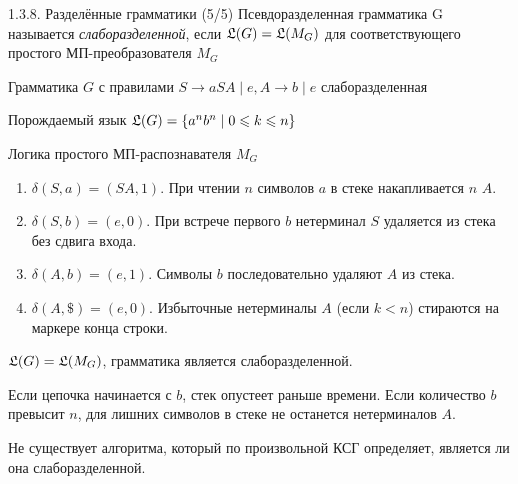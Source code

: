 \documentclass[mathserif,12pt,aspectratio=169]{beamer}
\renewcommand{\index}[1]{}
\def\odmkey#1#2{{\it\color{red} #1}\index{#2}}
\let\leq\leqslant
\begin{document}
\begin{frame}{1.3.8. Разделённые грамматики (5/5)}
Псевдоразделенная грамматика G называется \odmkey{слаборазделенной}{Слаборазделенная! грамматика}, если $\frak{L}(G) = \frak{L}(M_G)$ для соответствующего простого МП-преобразователя $M_G$

\begin{example}
    Грамматика $G$ с правилами \(S \to a S A \mid e, A \to b \mid e\) слаборазделенная

    Порождаемый язык \(\frak{L} (G) = \{ a^n b^n \mid  0 \leq k \leq n \} \)

    Логика простого МП-распознавателя \( M_G \)

\begin{enumerate}
\item \( \delta(S, a) = (SA, 1) \). При чтении \( n \) символов \( a \) в стеке накапливается \( n \) \( A\).
\item \( \delta(S, b) = (e, 0) \). При встрече первого \( b \) нетерминал \( S \) удаляется из стека без сдвига входа.
\item \( \delta(A, b) = (e, 1) \). Символы \( b \) последовательно удаляют \( A \) из стека.
\item \( \delta(A, \$) = (e, 0) \). Избыточные нетерминалы \( A \) (если \( k < n \)) стираются на маркере конца строки.
\end{enumerate}

\( \frak{L}(G) = \frak{L}(M_G) \), грамматика является слаборазделенной.

\begin{remark}
    Если цепочка начинается с \( b \), стек опустеет раньше времени. Если количество \( b \) превысит \( n \), для лишних символов в стеке не останется нетерминалов \( A\).
\end{remark}
\end{example}
\begin{remark}
    Не существует алгоритма, который по произвольной КСГ определяет, является ли она слаборазделенной.
\end{remark}
\end{frame}
\end{document}
